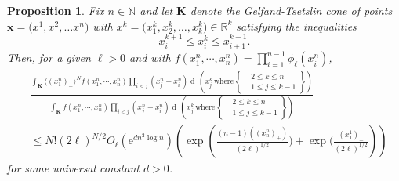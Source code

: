 \documentclass[11pt, reqno]{amsart}
\numberwithin{equation}{section}
\newcounter{dummy} \numberwithin{dummy}{section}
\newtheorem{proposition}[dummy]{Proposition}
\newcommand{\N}{\ensuremath{\mathbb{N}}}
\newcommand{\R}{\ensuremath{\mathbb{R}}}
\newcommand{\diff}{\ensuremath{\operatorname{d}\!}}
\begin{document}
\begin{proposition}\label{prop: integral ratio estimate}
 Fix $n\in \N$ and let $\boldsymbol{K}$ denote the Gelfand-Tsetslin cone of  points ${\mathbf x}= \bigl(x^{1},x^{2}, \ldots x^{n}\bigr)$ with  $x^{k}=\bigl(x^{k}_1,x^{k}_2, \ldots ,x^{k}_k\bigr) \in {\R}^k$ satisfying 
the inequalities 
\begin{equation*}
 x^{k+1}_{i} \leq x^{k}_i \leq x^{k+1}_{i+1}.
\end{equation*}
Then, for a given $\ell> 0$ and with $f(x^n_1, \cdots, x^n_n) = \prod^{n-1}_{i=1}\phi_\ell(x^n_i)$, 
\begin{equation*}
    \begin{array}{cc}
         & \frac{ \displaystyle\int_{\boldsymbol{K}}\langle (x^n_1)_-\rangle ^N f (x^n_1, \cdots, x^n_n)\displaystyle\prod_{i<j} (x^n_j-x^n_i) \diff\, \left(x^k_j\, \mathrm{where}\, \left.\begin{cases}
       &2\le k \le n\\
       &1\le j \le k-1
   \end{cases}\right\} \right)}{ \displaystyle\int_{\boldsymbol{K}}f (x^n_1, \cdots, x^n_n)\displaystyle\prod_{i<j} (x^n_j-x^n_i) \diff\, \left(x^k_j\, \mathrm{where}\, \left.\begin{cases}
       &2\le k \le n\\
       &1\le j \le k-1
   \end{cases}\right\} \right)} \\
         & \le 
   N!(2\ell)^{N/2}O_{\ell}(\mathrm{e}^{dn^2\log n})\left( \exp\left(\frac{(n-1)((x^n_n)_+)}{(2\ell)^{1/2}}\big)+\exp\big(\frac{(x^1_1)_-}{(2\ell)^{1/2}}\right)\right)
   \end{array}
\end{equation*}
for some universal constant $d>0$.
\end{proposition}
\end{document}

